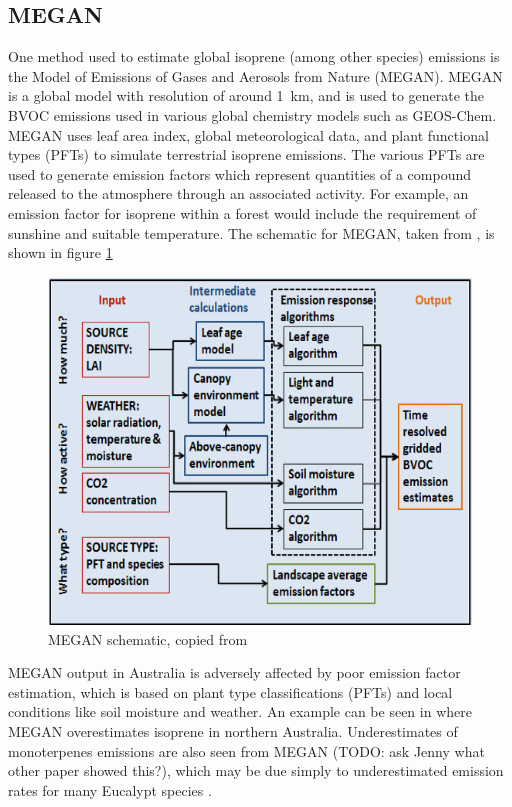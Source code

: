   \subsection{MEGAN}
    One method used to estimate global isoprene (among other species) emissions is the Model of Emissions of Gases and Aerosols from Nature (MEGAN). 
    MEGAN is a global model with resolution of around 1~km, and is used to generate the BVOC emissions used in various global chemistry models such as GEOS-Chem.
    MEGAN uses leaf area index, global meteorological data, and plant functional types (PFTs) to simulate terrestrial isoprene emissions.
    The various PFTs are used to generate emission factors which represent quantities of a compound released to the atmosphere through an associated activity.
    For example, an emission factor for isoprene within a forest would include the requirement of sunshine and suitable temperature.
    The schematic for MEGAN, taken from \citet{Megan_Website}, is shown in figure \ref{ch_isop:fig:megan_schematic}
    
    \begin{figure}[!htbp]
      \includegraphics[width=\textwidth]{Figures/MEGANmodel_img.jpg}
      \caption{MEGAN schematic, copied from \citet{Megan_Website}}
      \label{ch_isop:fig:megan_schematic}
    \end{figure}

    MEGAN output in Australia is adversely affected by poor emission factor estimation, which is based on plant type classifications (PFTs) and local conditions like soil moisture and weather. 
    An example can be seen in \citet{Muller2008} where MEGAN overestimates isoprene in northern Australia.
    Underestimates of monoterpenes emissions are also seen from MEGAN (TODO: ask Jenny what other paper showed this?), which may be due simply to underestimated emission rates for many Eucalypt species \citep{Winters2009}.
    

